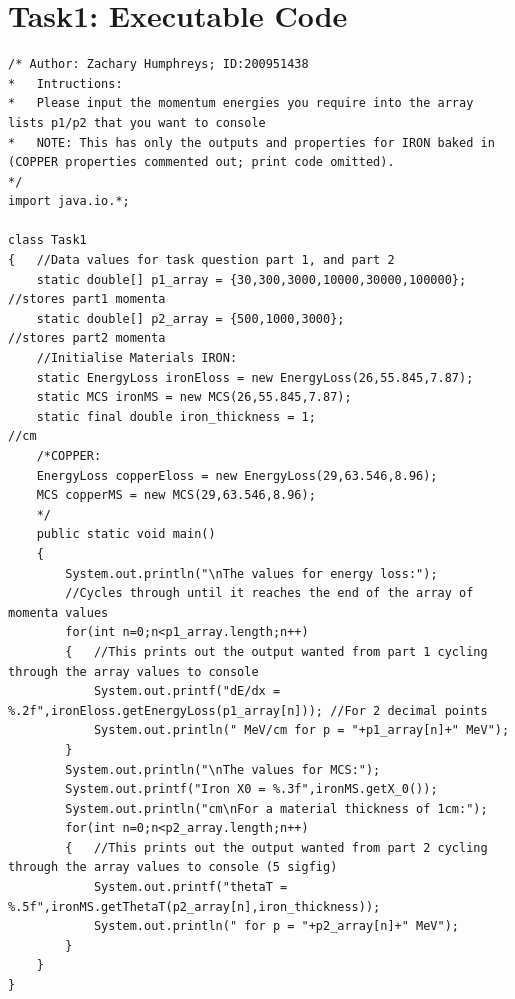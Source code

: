 \documentclass[twocolumn]{article}
\begin{document}
\section{Task1: Executable Code}
\begin{verbatim}
/* Author: Zachary Humphreys; ID:200951438
*   Intructions: 
*   Please input the momentum energies you require into the array lists p1/p2 that you want to console
*   NOTE: This has only the outputs and properties for IRON baked in (COPPER properties commented out; print code omitted).
*/
import java.io.*;

class Task1
{   //Data values for task question part 1, and part 2
	static double[] p1_array = {30,300,3000,10000,30000,100000};   //stores part1 momenta
	static double[] p2_array = {500,1000,3000};                    //stores part2 momenta
	//Initialise Materials IRON:
	static EnergyLoss ironEloss = new EnergyLoss(26,55.845,7.87);
	static MCS ironMS = new MCS(26,55.845,7.87);
	static final double iron_thickness = 1;                        //cm
	/*COPPER:
	EnergyLoss copperEloss = new EnergyLoss(29,63.546,8.96);
	MCS copperMS = new MCS(29,63.546,8.96);
	*/
	public static void main()
	{
		System.out.println("\nThe values for energy loss:");
		//Cycles through until it reaches the end of the array of momenta values
		for(int n=0;n<p1_array.length;n++)
		{   //This prints out the output wanted from part 1 cycling through the array values to console
			System.out.printf("dE/dx = %.2f",ironEloss.getEnergyLoss(p1_array[n])); //For 2 decimal points
			System.out.println(" MeV/cm for p = "+p1_array[n]+" MeV");
		}
		System.out.println("\nThe values for MCS:");
		System.out.printf("Iron X0 = %.3f",ironMS.getX_0());
		System.out.println("cm\nFor a material thickness of 1cm:");
		for(int n=0;n<p2_array.length;n++)
		{   //This prints out the output wanted from part 2 cycling through the array values to console (5 sigfig)
			System.out.printf("thetaT = %.5f",ironMS.getThetaT(p2_array[n],iron_thickness));
			System.out.println(" for p = "+p2_array[n]+" MeV");
		}
	}   
}
\end{verbatim}
\end{document}

